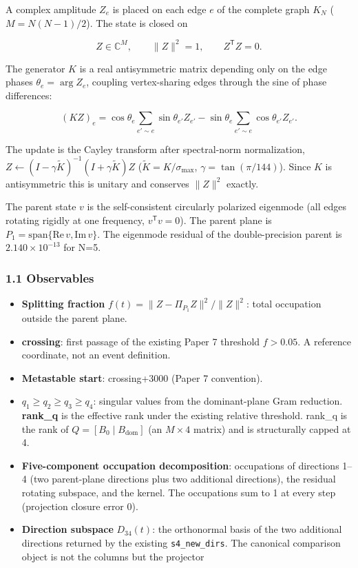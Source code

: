 \documentclass[
  a4paper,
]{article}
\providecommand{\tightlist}{%
  \setlength{\itemsep}{0pt}\setlength{\parskip}{0pt}}
\begin{document}
A complex amplitude \(Z_e\) is placed on each edge \(e\) of the complete
graph \(K_N\) (\(M=N(N-1)/2\)). The state is closed on

\[Z\in\mathbb C^M,\qquad \lVert Z\rVert^2=1,\qquad Z^{\mathsf T}Z=0.\]

The generator \(K\) is a real antisymmetric matrix depending only on the
edge phases \(\theta_e=\arg Z_e\), coupling vertex-sharing edges through
the sine of phase differences:

\[(KZ)_e=\cos\theta_e\!\sum_{e'\sim e}\!\sin\theta_{e'}Z_{e'}-\sin\theta_e\!\sum_{e'\sim e}\!\cos\theta_{e'}Z_{e'}.\]

The update is the Cayley transform after spectral-norm normalization,
\(Z\leftarrow(I-\gamma\tilde K)^{-1}(I+\gamma\tilde K)Z\)
(\(\tilde K=K/\sigma_{\max}\), \(\gamma=\tan(\pi/144)\)). Since \(K\) is
antisymmetric this is unitary and conserves \(\lVert Z\rVert^2\)
exactly.

The parent state \(v\) is the self-consistent circularly polarized
eigenmode (all edges rotating rigidly at one frequency,
\(v^{\mathsf T}v=0\)). The parent plane is
\(P_1=\mathrm{span}\{\mathrm{Re}\,v,\mathrm{Im}\,v\}\). The eigenmode
residual of the double-precision parent is \(2.140\times10^{-13}\) for
N=5.

\subsubsection{1.1 Observables}\label{observables}

\begin{itemize}
\tightlist
\item
  \textbf{Splitting fraction}
  \(f(t)=\lVert Z-\Pi_{P_1}Z\rVert^2/\lVert Z\rVert^2\): total
  occupation outside the parent plane.
\item
  \textbf{crossing}: first passage of the existing Paper 7 threshold
  \(f>0.05\). A reference coordinate, not an event definition.
\item
  \textbf{Metastable start}: crossing+3000 (Paper 7 convention).
\item
  \textbf{\(q_1\ge q_2\ge q_3\ge q_4\)}: singular values from the
  dominant-plane Gram reduction. \textbf{rank\_q} is the effective rank
  under the existing relative threshold. rank\_q is the rank of
  \(Q=[B_0\mid B_{\mathrm{dom}}]\) (an \(M\times4\) matrix) and is
  structurally capped at 4.
\item
  \textbf{Five-component occupation decomposition}: occupations of
  directions 1--4 (two parent-plane directions plus two additional
  directions), the residual rotating subspace, and the kernel. The
  occupations sum to 1 at every step (projection closure error 0).
\item
  \textbf{Direction subspace} \(D_{34}(t)\): the orthonormal basis of
  the two additional directions returned by the existing
  \texttt{s4\_new\_dirs}. The canonical comparison object is not the
  columns but the projector
\end{itemize}
\end{document}
